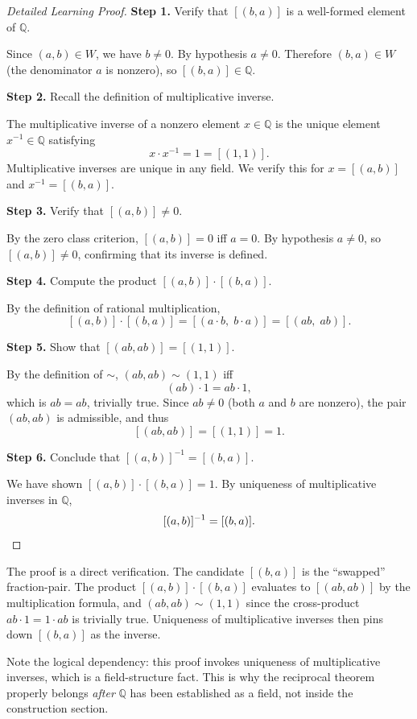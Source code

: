 \begin{proof}[Detailed Learning Proof]
\LRAProofBodyStart

\textbf{Step 1.} Verify that $[(b,a)]$ is a well-formed element of $\mathbb{Q}$.

Since $(a,b)\in W$, we have $b\neq 0$. By hypothesis $a\neq 0$. Therefore
$(b,a)\in W$ (the denominator $a$ is nonzero), so $[(b,a)]\in\mathbb{Q}$.

\textbf{Step 2.} Recall the definition of multiplicative inverse.

The multiplicative inverse of a nonzero element $x\in\mathbb{Q}$ is the
unique element $x^{-1}\in\mathbb{Q}$ satisfying
\[
x\cdot x^{-1} = 1 = [(1,1)].
\]
Multiplicative inverses are unique in any field. We verify this for
$x = [(a,b)]$ and $x^{-1} = [(b,a)]$.

\textbf{Step 3.} Verify that $[(a,b)]\neq 0$.

By the zero class criterion, $[(a,b)] = 0$ iff $a = 0$. By hypothesis
$a\neq 0$, so $[(a,b)]\neq 0$, confirming that its inverse is defined.

\textbf{Step 4.} Compute the product $[(a,b)]\cdot[(b,a)]$.

By the definition of rational multiplication,
\[
[(a,b)]\cdot[(b,a)]
= [(a\cdot b,\; b\cdot a)]
= [(ab,\; ab)].
\]

\textbf{Step 5.} Show that $[(ab,ab)] = [(1,1)]$.

By the definition of $\sim$, $(ab,ab)\sim(1,1)$ iff
\[
(ab)\cdot 1 = ab\cdot 1,
\]
which is $ab = ab$, trivially true. Since $ab\neq 0$ (both $a$ and $b$
are nonzero), the pair $(ab,ab)$ is admissible, and thus
\[
[(ab,ab)] = [(1,1)] = 1.
\]

\textbf{Step 6.} Conclude that $[(a,b)]^{-1} = [(b,a)]$.

We have shown $[(a,b)]\cdot[(b,a)] = 1$. By uniqueness of multiplicative
inverses in $\mathbb{Q}$,
\[
[(a,b)]^{-1} = [(b,a)]. \qedhere
\]
\end{proof}

\begin{remark*}
The proof is a direct verification. The candidate $[(b,a)]$ is the
``swapped'' fraction-pair. The product $[(a,b)]\cdot[(b,a)]$ evaluates
to $[(ab,ab)]$ by the multiplication formula, and $(ab,ab)\sim(1,1)$ since
the cross-product $ab\cdot 1 = 1\cdot ab$ is trivially true. Uniqueness of
multiplicative inverses then pins down $[(b,a)]$ as the inverse.

Note the logical dependency: this proof invokes uniqueness of multiplicative
inverses, which is a field-structure fact. This is why the reciprocal theorem
properly belongs \emph{after} $\mathbb{Q}$ has been established as a field,
not inside the construction section.
\end{remark*}

